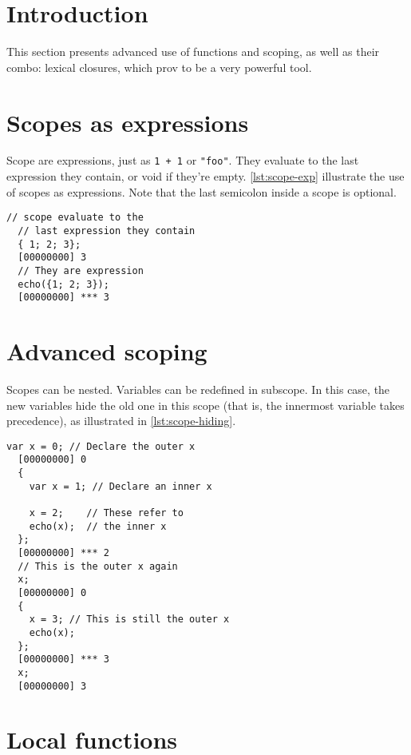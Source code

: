 \documentclass[openright,twoside,12pt]{report}
\begin{document}
\section{Introduction}

This section presents advanced use of functions and scoping, as well
as their combo: lexical closures, which prov to be a very powerful
tool.

\section{Scopes as expressions}

Scope are expressions, just as \lstinline|1 + 1| or \lstinline|"foo"|.
They evaluate to the last expression they contain, or void if they're
empty. \autoref{lst:scope-exp} illustrate the use of scopes as
expressions. Note that the last semicolon inside a scope is optional.

\begin{lstlisting}[caption=Using scope as expressions,label=lst:scope-exp]
  // scope evaluate to the
  // last expression they contain
  { 1; 2; 3};
  [00000000] 3
  // They are expression
  echo({1; 2; 3});
  [00000000] *** 3
\end{lstlisting}

\section{Advanced scoping}

Scopes can be nested. Variables can be redefined in subscope. In this
case, the new variables hide the old one in this scope (that is, the
innermost variable takes precedence), as illustrated in
\autoref{lst:scope-hiding}.

\begin{lstlisting}[caption=Redefining variables in
  subscopes,label=lst:scope-hiding]
  var x = 0; // Declare the outer x
  [00000000] 0
  {
    var x = 1; // Declare an inner x

    x = 2;    // These refer to
    echo(x);  // the inner x
  };
  [00000000] *** 2
  // This is the outer x again
  x;
  [00000000] 0
  {
    x = 3; // This is still the outer x
    echo(x);
  };
  [00000000] *** 3
  x;
  [00000000] 3

\end{lstlisting}

\section{Local functions}
\end{document}
